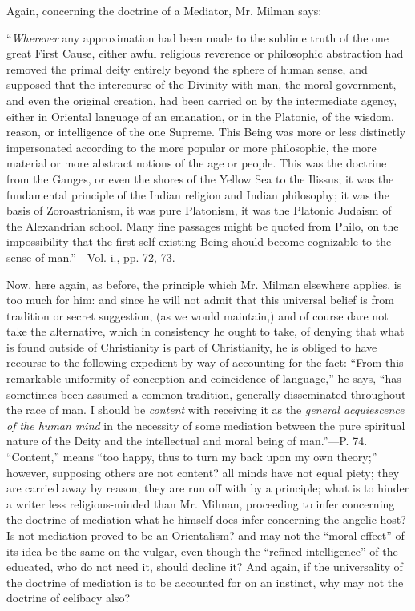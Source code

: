 Again, concerning the doctrine of a Mediator, Mr.
Milman says:

``\emph{Wherever}
any approximation had been made to the sublime truth of the one great
First Cause, either awful religious reverence or philosophic
abstraction had removed the primal deity entirely beyond the sphere of
human sense, and supposed that the intercourse of the Divinity with
man, the moral government, and even the
original creation, had been carried on by the intermediate agency,
either in Oriental language of an emanation, or in the Platonic, of
the wisdom, reason, or intelligence of the one Supreme. This Being was
more or less distinctly impersonated according to the more popular or
more philosophic, the more material or more abstract notions of the
age or people. This was the doctrine from the Ganges, or even the
shores of the Yellow Sea to the Ilissus; it was the fundamental
principle of the Indian religion and Indian philosophy; it was the
basis of Zoroastrianism, it was pure Platonism, it was the Platonic
Judaism of the Alexandrian school. Many fine passages might be quoted
from Philo, on the impossibility that the first self-existing Being
should become cognizable to the sense of man.''—Vol. i., pp. 72, 73.

Now, here again, as before, the principle which
Mr. Milman elsewhere applies, is too much for him: and since he will
not admit that this universal belief is from tradition or secret
suggestion, (as we would maintain,) and of course dare not take the
alternative, which in consistency he ought to take, of denying that
what is found outside of Christianity is part of Christianity, he is
obliged to have recourse to the following expedient by way of
accounting for the fact: ``From this remarkable uniformity of
conception and coincidence of language,'' he says, ``has sometimes been
assumed a common tradition, generally disseminated throughout the race
of man. I should be \emph{content} with receiving it as the \emph{general
acquiescence of the human mind} in the necessity of some mediation
between the pure spiritual nature of the Deity and the intellectual
and moral being of man.''—P. 74. ``Content,'' means ``too happy, thus to
turn my back upon my own theory;'' however, supposing others are not
content? all minds have not equal piety; they are carried away by
reason; they are run off with by a principle; what is to hinder a
writer less religious-minded than Mr. Milman, proceeding to infer
concerning the doctrine of mediation what he himself does infer
concerning the angelic host? Is not mediation proved to be an
Orientalism? and may not the ``moral effect'' of its idea be the same on
the vulgar, even though the ``refined intelligence'' of the educated,
who do not need it, should decline it? And again, if the universality
of the doctrine of mediation is to be accounted for on an instinct,
why may not the doctrine of celibacy also?

